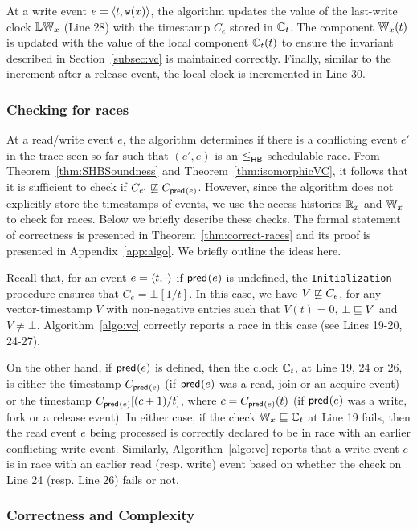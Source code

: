 At a write event $e = \langle t, \mathtt{w}(x)\rangle$, the algorithm updates the value of the
last-write clock $\mathbb{LW}_x$ (Line 28) with the timestamp $C_e$ stored in $\mathbb{C}_t$.
The component $\mathbb{W}_x(t)$ is updated with the value of the local component $\mathbb{C}_t(t)$
to ensure the invariant described in Section~\ref{subsec:vc} is maintained correctly.
Finally, similar to the increment after a release event, the local clock is incremented
in Line 30.

\subsubsection{Checking for races}

At a read/write event $e$, the algorithm determines if
there is a conflicting event $e'$ in the trace seen so far such that
$(e', e)$ is an $\leq^{}_{\mathsf{HB}}$-schedulable race.
From Theorem~\ref{thm:SHBSoundness} and Theorem~\ref{thm:isomorphicVC}, 
it follows that it is sufficient to check if $C_{e'} \not\sqsubseteq C_{\mathsf{pred}_{}(e)}$.
However, since the algorithm does not explicitly store the
timestamps of events, we use the access histories $\mathbb{R}_x$
and $\mathbb{W}_x$ to check for races.
Below we briefly describe these checks.
The formal statement of correctness is presented in Theorem~\ref{thm:correct-races}
and its proof is presented in Appendix~\ref{app:algo}.
We briefly outline the ideas here.

Recall that, for an event $e = \langle t, \cdot\rangle$ 
if $\mathsf{pred}_{}(e)$ is undefined, the \texttt{Initialization}
procedure ensures that  $C_e = \bot[1/t]$.
In this case, we have $V \not\sqsubseteq C_e$, for any
vector-timestamp $V$ with non-negative entries
such that $V(t) = 0$, $\bot \sqsubseteq V$ and $V \neq \bot$. 
Algorithm~\ref{algo:vc} correctly reports a race in 
this case (see Lines 19-20, 24-27).

On the other hand, if $\mathsf{pred}_{}(e)$ is defined,
then the clock $\mathbb{C}_t$, at Line 19, 24 or 26, 
is either the timestamp $C_{\mathsf{pred}_{}(e)}$ (if $\mathsf{pred}_{}(e)$
was a read, join or an acquire event) or the timestamp 
$C_{\mathsf{pred}_{}(e)}[(c+1)/t]$, where $c = C_{\mathsf{pred}_{}(e)}(t)$
(if $\mathsf{pred}_{}(e)$
was a write, fork or a release event).
In either case, if the check $\mathbb{W}_x \sqsubseteq \mathbb{C}_t$ at Line 19 fails,
then the read event $e$ being processed is correctly declared to
be in race with an earlier conflicting write event.
Similarly, Algorithm~\ref{algo:vc} reports that
a write event $e$ is in race with an earlier read (resp. write)
event based on whether the check on Line 24 (resp. Line 26) fails or not. 

\subsubsection{Correctness and Complexity}

